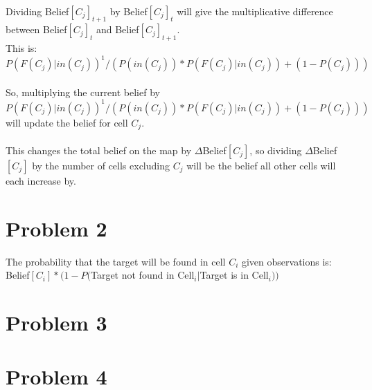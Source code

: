 \documentclass[12pt]{report}
\begin{document}
\\
Dividing Belief$[C_{j}]_{t+1}$ by Belief$[C_{j}]_{t}$ will give the multiplicative difference between Belief$[C_{j}]_{t}$ and Belief$[C_{j}]_{t+1}$.\\
This is: $P(F(C_{j})|in(C_{j}))^{1}/(P(in(C_{j}))*P(F(C_{j})|in(C_{j}))+(1-P(C_{j})))$\\
\\
So, multiplying the current belief by $P(F(C_{j})|in(C_{j}))^{1}/(P(in(C_{j}))*P(F(C_{j})|in(C_{j}))+(1-P(C_{j})))$ will update the belief for cell $C_{j}$.\\
\\
This changes the total belief on the map by $\Delta$Belief$[C_{j}]$, so dividing $\Delta$Belief$[C_{j}]$ by the number of cells excluding $C_{j}$ will be the belief all other cells will each increase by.

\section{Problem 2}
The probability that the target will be found in cell $C_{i}$ given observations is:\\
Belief$[C_{i}]*(1-P($Target not found in Cell$_{i}|$Target is in Cell$_{i}))$


\section{Problem 3}


\section{Problem 4}
\end{document}
